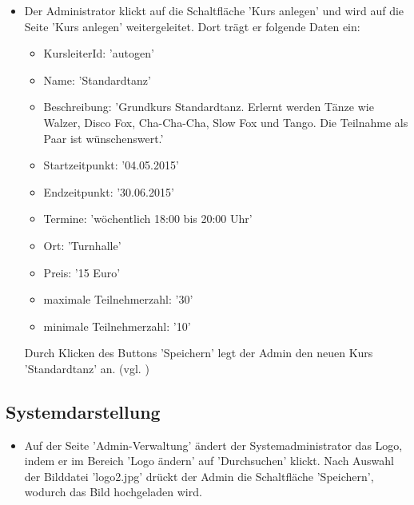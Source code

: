 \documentclass[a4paper]{scrreprt}
\begin{document}
\begin{itemize}
				\item {}
				 Der Administrator klickt auf die Schaltfläche 'Kurs anlegen' und wird auf die Seite 'Kurs anlegen' weitergeleitet. Dort trägt er folgende Daten ein:
						\begin{itemize}
							\item KursleiterId: 'autogen'
							\item Name: 'Standardtanz'
							\item Beschreibung: 'Grundkurs Standardtanz. Erlernt werden Tänze wie Walzer, Disco Fox, Cha-Cha-Cha, Slow Fox und Tango. Die Teilnahme als Paar ist wünschenswert.'
							\item Startzeitpunkt: '04.05.2015'
							\item Endzeitpunkt: '30.06.2015'
							\item Termine: 'wöchentlich 18:00 bis 20:00 Uhr'
							\item Ort: 'Turnhalle'
							\item Preis: '15 Euro'
							\item maximale Teilnehmerzahl: '30'	
							\item minimale Teilnehmerzahl: '10'
						\end{itemize}
				 Durch Klicken des Buttons 'Speichern' legt der Admin den neuen Kurs 'Standardtanz' an. (vgl. ) 					
			\end{itemize}			
								
		\subsection{Systemdarstellung}
			\begin{itemize}
				 \item {} 
				 Auf der Seite 'Admin-Verwaltung' ändert der Systemadministrator das Logo, indem er im Bereich 'Logo ändern' auf 'Durchsuchen' klickt. Nach Auswahl der Bilddatei 'logo2.jpg' drückt der Admin die Schaltfläche 'Speichern', wodurch das Bild hochgeladen wird.
			\end{itemize}
			
\end{document}
